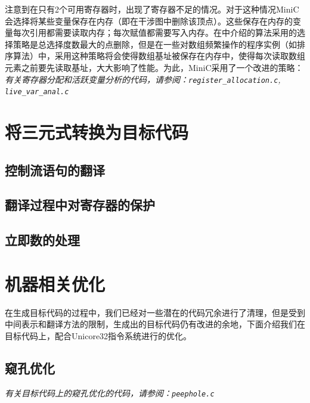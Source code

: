 注意到在只有2个可用寄存器时，出现了寄存器不足的情况。对于这种情况MiniC会选择将某些变量保存在内存（即在干涉图中删除该顶点）。这些保存在内存的变量每次引用都需要读取内存；每次赋值都需要写入内存。在\cite{sunjiasu}中介绍的算法采用的选择策略是总选择度数最大的点删除，但是在一些对数组频繁操作的程序实例（如排序算法）中，采用这种策略将会使得数组基址被保存在内存中，使得每次读取数组元素之前要先读取基址，大大影响了性能。为此，MiniC采用了一个改进的策略：\\

{\it \anchor 有关寄存器分配和活跃变量分析的代码，请参阅：\verb|register_allocation.c|, \verb|live_var_anal.c|}\\
\section{将三元式转换为目标代码}

\subsection{控制流语句的翻译}

\subsection{翻译过程中对寄存器的保护}

\subsection{立即数的处理}

\section{机器相关优化}
在生成目标代码的过程中，我们已经对一些潜在的代码冗余进行了清理，但是受到中间表示和翻译方法的限制，生成出的目标代码仍有改进的余地，下面介绍我们在目标代码上，配合Unicore32指令系统进行的优化。
\subsection{窥孔优化}
{\it \anchor 有关目标代码上的窥孔优化的代码，请参阅：\verb|peephole.c|}\\
